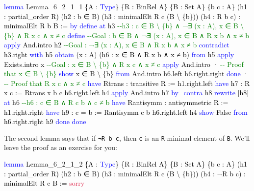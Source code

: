 \documentclass[
  letterpaper,
  DIV=11,
  numbers=noendperiod]{scrreprt}
\newenvironment{Shaded}{\begin{snugshade}}{\end{snugshade}}
\newcommand{\CommentTok}[1]{\textcolor[rgb]{0.37,0.37,0.37}{#1}}
\newcommand{\ConstantTok}[1]{\textcolor[rgb]{0.56,0.35,0.01}{#1}}
\newcommand{\KeywordTok}[1]{\textcolor[rgb]{0.00,0.23,0.31}{#1}}
\newcommand{\NormalTok}[1]{\textcolor[rgb]{0.00,0.23,0.31}{#1}}
\renewcommand{\NormalTok}[1]{\textcolor[HTML]{000000}{#1}}
\renewcommand{\KeywordTok}[1]{\textcolor[HTML]{0000FF}{#1}}
\renewcommand{\CommentTok}[1]{\textcolor[HTML]{008000}{#1}}
\renewcommand{\ConstantTok}[1]{\textcolor[HTML]{DC143C}{#1}}
\theoremstyle{remark}
\begin{document}
\begin{Shaded}
\begin{Highlighting}[]
\KeywordTok{lemma}\NormalTok{ Lemma\_6\_2\_1\_1 \{A : }\KeywordTok{Type}\NormalTok{\} \{R : BinRel A\} \{B : Set A\} \{b c : A\}}
\NormalTok{    (h1 : partial\_order R) (h2 : b ∈ B) (h3 : minimalElt R c (B \textbackslash{} \{b\}))}
\NormalTok{    (h4 : R b c) : minimalElt R b B := }\KeywordTok{by}
  \KeywordTok{define} \KeywordTok{at}\NormalTok{ h3}
    \CommentTok{{-}{-}h3 : c ∈ B \textbackslash{} \{b\} ∧ ¬∃ (x : A), x ∈ B \textbackslash{} \{b\} ∧ R x c ∧ x ≠ c}
  \KeywordTok{define}  \CommentTok{{-}{-}Goal : b ∈ B ∧ ¬∃ (x : A), x ∈ B ∧ R x b ∧ x ≠ b}
  \KeywordTok{apply}\NormalTok{ And.intro h2    }\CommentTok{{-}{-}Goal : ¬∃ (x : A), x ∈ B ∧ R x b ∧ x ≠ b}
  \KeywordTok{contradict}\NormalTok{ h3.right }\KeywordTok{with}\NormalTok{ h5}
  \KeywordTok{obtain}\NormalTok{ (x : A) (h6 : x ∈ B ∧ R x b ∧ x ≠ b) }\KeywordTok{from}\NormalTok{ h5}
  \KeywordTok{apply}\NormalTok{ Exists.intro x  }\CommentTok{{-}{-}Goal : x ∈ B \textbackslash{} \{b\} ∧ R x c ∧ x ≠ c}
  \KeywordTok{apply}\NormalTok{ And.intro}
\NormalTok{  · }\CommentTok{{-}{-} Proof that x ∈ B \textbackslash{} \{b\}}
    \KeywordTok{show}\NormalTok{ x ∈ B \textbackslash{} \{b\} }\KeywordTok{from}\NormalTok{ And.intro h6.left h6.right.right}
    \KeywordTok{done}
\NormalTok{  · }\CommentTok{{-}{-} Proof that R x c ∧ x ≠ c}
    \KeywordTok{have}\NormalTok{ Rtrans : transitive R := h1.right.left}
    \KeywordTok{have}\NormalTok{ h7 : R x c := Rtrans x b c h6.right.left h4}
    \KeywordTok{apply}\NormalTok{ And.intro h7}
    \KeywordTok{by\_contra}\NormalTok{ h8}
    \KeywordTok{rewrite}\NormalTok{ [h8] }\KeywordTok{at}\NormalTok{ h6  }\CommentTok{{-}{-}h6 : c ∈ B ∧ R c b ∧ c ≠ b}
    \KeywordTok{have}\NormalTok{ Rantisymm : antisymmetric R := h1.right.right}
    \KeywordTok{have}\NormalTok{ h9 : c = b := Rantisymm c b h6.right.left h4}
    \KeywordTok{show}\NormalTok{ False }\KeywordTok{from}\NormalTok{ h6.right.right h9}
    \KeywordTok{done}
  \KeywordTok{done}
\end{Highlighting}
\end{Shaded}

The second lemma says that if \texttt{¬R\ b\ c}, then \texttt{c} is an
\texttt{R}-minimal element of \texttt{B}. We'll leave the proof as an
exercise for you:

\begin{Shaded}
\begin{Highlighting}[]
\KeywordTok{lemma}\NormalTok{ Lemma\_6\_2\_1\_2 \{A : }\KeywordTok{Type}\NormalTok{\} \{R : BinRel A\} \{B : Set A\} \{b c : A\}}
\NormalTok{    (h1 : partial\_order R) (h2 : b ∈ B) (h3 : minimalElt R c (B \textbackslash{} \{b\}))}
\NormalTok{    (h4 : ¬R b c) : minimalElt R c B := }\ConstantTok{sorry}
\end{Highlighting}
\end{Shaded}
\end{document}
